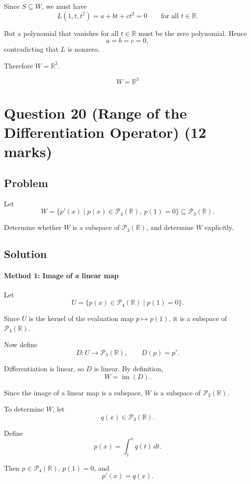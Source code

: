 \documentclass[12pt]{article}
\begin{document}
Since \(S\subseteq W\), we must have
\[
L(1,t,t^2)=a+bt+ct^2=0
\qquad
\text{for all }t\in\mathbb R.
\]

But a polynomial that vanishes for all \(t\in\mathbb R\) must be the zero polynomial. Hence
\[
a=b=c=0,
\]
contradicting that \(L\) is nonzero.

Therefore \(W=\mathbb R^3\).

\[
\boxed{W=\mathbb R^3}
\]

\newpage
\section{Question 20 (Range of the Differentiation Operator) \hfill (12 marks)}
\subsection{Problem}

Let
\[
W=\{p'(x)\mid p(x)\in\mathcal P_4(\mathbb R),\ p(1)=0\}\subseteq \mathcal P_3(\mathbb R).
\]

Determine whether \(W\) is a subspace of \(\mathcal P_3(\mathbb R)\), and determine \(W\) explicitly.

\subsection{Solution}

\paragraph{Method 1: Image of a linear map}

Let
\[
U=\{p(x)\in\mathcal P_4(\mathbb R)\mid p(1)=0\}.
\]

Since \(U\) is the kernel of the evaluation map \(p\mapsto p(1)\), it is a subspace of \(\mathcal P_4(\mathbb R)\).

Now define
\[
D:U\to\mathcal P_3(\mathbb R),\qquad D(p)=p'.
\]

Differentiation is linear, so \(D\) is linear. By definition,
\[
W=\operatorname{im}(D).
\]

Since the image of a linear map is a subspace, \(W\) is a subspace of \(\mathcal P_3(\mathbb R)\).

To determine \(W\), let
\[
q(x)\in\mathcal P_3(\mathbb R).
\]

Define
\[
p(x)=\int_1^x q(t)\,dt.
\]

Then \(p\in\mathcal P_4(\mathbb R)\), \(p(1)=0\), and
\[
p'(x)=q(x).
\]
\end{document}
